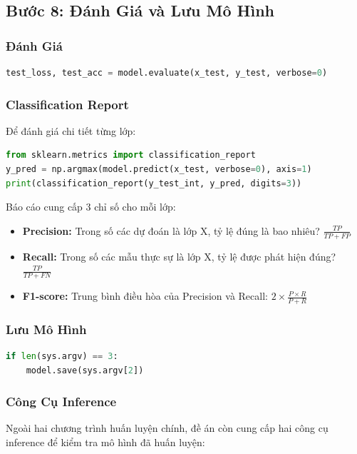 \documentclass[12pt,a4paper]{article}
\begin{document}
\subsection{Bước 8: Đánh Giá và Lưu Mô Hình}

\subsubsection*{Đánh Giá}
\begin{lstlisting}[language=Python]
test_loss, test_acc = model.evaluate(x_test, y_test, verbose=0)
\end{lstlisting}

\subsubsection*{Classification Report}
Để đánh giá chi tiết từng lớp:

\begin{lstlisting}[language=Python]
from sklearn.metrics import classification_report
y_pred = np.argmax(model.predict(x_test, verbose=0), axis=1)
print(classification_report(y_test_int, y_pred, digits=3))
\end{lstlisting}

Báo cáo cung cấp 3 chỉ số cho mỗi lớp:
\begin{itemize}
    \item \textbf{Precision:} Trong số các dự đoán là lớp X, tỷ lệ đúng là bao nhiêu? $\frac{TP}{TP + FP}$
    \item \textbf{Recall:} Trong số các mẫu thực sự là lớp X, tỷ lệ được phát hiện đúng? $\frac{TP}{TP + FN}$
    \item \textbf{F1-score:} Trung bình điều hòa của Precision và Recall: $2 \times \frac{P \times R}{P + R}$
\end{itemize}

\subsubsection*{Lưu Mô Hình}
\begin{lstlisting}[language=Python]
if len(sys.argv) == 3:
    model.save(sys.argv[2])
\end{lstlisting}

\subsubsection*{Công Cụ Inference}

Ngoài hai chương trình huấn luyện chính, đề án còn cung cấp hai công cụ inference để kiểm tra mô hình đã huấn luyện:
\end{document}
